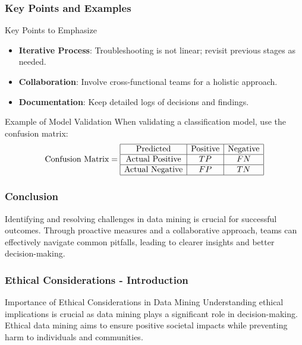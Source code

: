 \documentclass[aspectratio=169]{beamer}
\begin{document}
\begin{frame}[fragile]
    \frametitle{Key Points and Examples}
    
    \begin{block}{Key Points to Emphasize}
        \begin{itemize}
            \item \textbf{Iterative Process}: Troubleshooting is not linear; revisit previous stages as needed.
            \item \textbf{Collaboration}: Involve cross-functional teams for a holistic approach.
            \item \textbf{Documentation}: Keep detailed logs of decisions and findings.
        \end{itemize}
    \end{block}
    
    \begin{block}{Example of Model Validation}
        When validating a classification model, use the confusion matrix:
        \[
        \text{Confusion Matrix} = 
        \begin{array}{|c|c|c|}
        \hline
        \text{Predicted} & \text{Positive} & \text{Negative} \\
        \hline
        \text{Actual Positive} & TP & FN \\
        \hline
        \text{Actual Negative} & FP & TN \\
        \hline
        \end{array}
        \]
    \end{block}
\end{frame}

\begin{frame}[fragile]
    \frametitle{Conclusion}
    Identifying and resolving challenges in data mining is crucial for successful outcomes. Through proactive measures and a collaborative approach, teams can effectively navigate common pitfalls, leading to clearer insights and better decision-making.
\end{frame}

\begin{frame}[fragile]
    \frametitle{Ethical Considerations - Introduction}
    \begin{block}{Importance of Ethical Considerations in Data Mining}
        Understanding ethical implications is crucial as data mining plays a significant role in decision-making. Ethical data mining aims to ensure positive societal impacts while preventing harm to individuals and communities.
    \end{block}
\end{frame}
\end{document}

